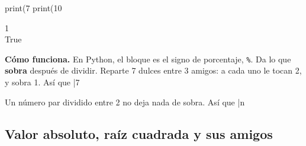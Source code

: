 \begin{tcbraster}[raster columns=1, raster valign=center, raster row skip=6pt]
\begin{tcolorbox}[colback=white, colframe=white, boxrule=0pt, valign=center]
\begin{scratch}
\end{scratch}
\end{tcolorbox}
\begin{tcolorbox}[colback=white, colframe=white, boxrule=0pt, left=0pt, right=0pt, top=0pt, bottom=0pt, valign=center]
\begin{code}
print(7 %
print(10 %
\end{code}
\begin{outputbox}
1\\
True
\end{outputbox}
\end{tcolorbox}
\end{tcbraster}

\textbf{Cómo funciona.} En Python, el bloque  es el signo de porcentaje, \texttt{\%}. Da lo que \textbf{sobra} después de dividir. Reparte 7 dulces entre 3 amigos: a cada uno le tocan 2, y sobra 1. Así que \py|7 %

\begin{think}
Un número par dividido entre 2 no deja nada de sobra. Así que \py|n %
\end{think}

\subsection*{Valor absoluto, raíz cuadrada y sus amigos}

